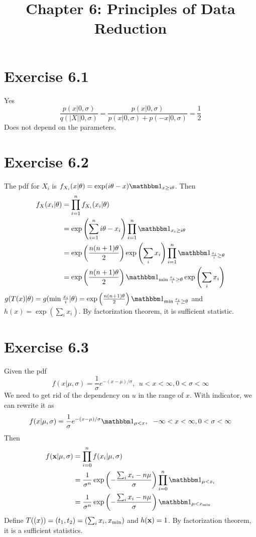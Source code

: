 \documentclass[12pt]{article}
\title{Chapter 6: Principles of Data Reduction}
\begin{document}
\maketitle

\section*{Exercise 6.1}
Yes
$$
 \frac{p(x|0,\sigma)}{q(|X| | 0, \sigma)} = \frac{p(x|0,\sigma)}{p(x| 0, \sigma) + p(-x|0, \sigma)} = \frac{1}{2}
$$
Does not depend on the parameters.

\section*{Exercise 6.2}
The pdf for $X_i$ is $f_{X_i}(x|\theta) = \exp(i\theta - x)\one_{x\geq i\theta}$. Then 
$$\begin{aligned}
   f_X(x_i|\theta) &= \prod_{i=1}^n f_{X_i}(x_i|\theta) \\
    	&=  \exp\left(\sum_{i=1}^n i\theta - x_i\right) \prod_{i=1}^n \one_{x_i \geq i\theta} \\ 
    	&=  \exp\left(\frac{n(n+1)\theta}{2}\right) \exp\left(\sum_i x_i\right)  \prod_{i=1}^n \one_{\frac{x_i}{i} \geq \theta} \\
    	&=  \exp\left(\frac{n(n+1)\theta}{2}\right)   \one_{\min \frac{x_i}{i} \geq \theta}  \exp\left(\sum_i x_i\right)
\end{aligned}
$$
$g(T(x)|\theta) = g(\min \frac{x_i}{i}|\theta) =  \exp\left(\frac{n(n+1)\theta}{2}\right)   \one_{\min \frac{x_i}{i} \geq \theta}$ and $h(x) = \exp\left(\sum_i x_i\right)$. By factorization theorem, it is sufficient statistic.

\section*{Exercise 6.3}
Given the pdf 
$$ f(x | \mu, \sigma) = \frac{1}{\sigma} e^{-(x-\mu)/\sigma}, \ \ u<x <\infty, 0 < \sigma < \infty$$
We need to get rid of the dependency on $u$ in the range of $x$. With indicator, we can rewrite it as
$$ f(x | \mu, \sigma) = \frac{1}{\sigma} e^{-(x-\mu)/\sigma}\one_{\mu < x}, \ \ -\infty <x <\infty, 0 < \sigma < \infty$$
Then $$
\begin{aligned}
	f(\vb{x} | \mu, \sigma) &= \prod^n_{i=0} 	f(x_i | \mu, \sigma) \\
		&= \frac{1}{\sigma^n} \exp\left(-\frac{\sum_i{x_i} - n\mu}{\sigma}\right)   \prod^n_{i=0} \one_{\mu < x_i} \\
		&= \frac{1}{\sigma^n} \exp\left(-\frac{\sum_i{x_i} - n\mu}{\sigma}\right)   \one_{\mu <  x_{\min}}
\end{aligned}
$$
Define $T(\boldmath(x)) = (t_1, t_2) = (\sum_i x_i, x_{\min})$ and $h(\vb{x}) = 1$. By factorization theorem, it is a sufficient statistics.
\end{document}
